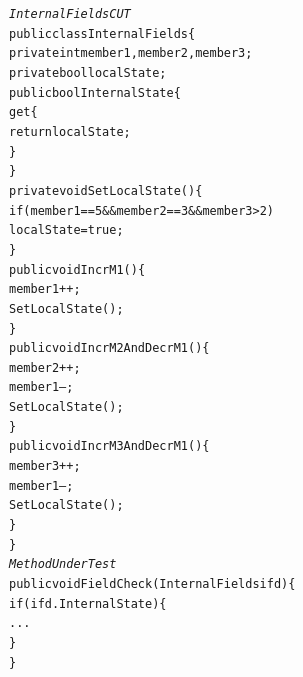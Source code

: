 \begin{figure}[t]
\begin{CodeOut}
\begin{alltt}
\emph{InternalFields CUT}
public class InternalFields \{
\hspace*{0.2in}private int member1, member2, member3;
\hspace*{0.2in}private bool localState;
\hspace*{0.2in}public bool InternalState \{
\hspace*{0.3in}get \{
\hspace*{0.4in}return localState;
\hspace*{0.3in}\}
\hspace*{0.2in}\}
\hspace*{0.2in}private void SetLocalState() \{
\hspace*{0.3in}if (member1 == 5 && member2 == 3 && member3 > 2)
\hspace*{0.4in}localState = true;
\hspace*{0.2in}\}
\hspace*{0.2in}public void IncrM1() \{
\hspace*{0.3in}member1++;
\hspace*{0.3in}SetLocalState();
\hspace*{0.2in}\}
\hspace*{0.2in}public void IncrM2AndDecrM1() \{
\hspace*{0.3in}member2++;
\hspace*{0.3in}member1--;
\hspace*{0.3in}SetLocalState();
\hspace*{0.2in}\}
\hspace*{0.2in}public void IncrM3AndDecrM1() \{
\hspace*{0.3in}member3++;
\hspace*{0.3in}member1--;
\hspace*{0.3in}SetLocalState();
\hspace*{0.2in}\}   
\}
\emph{Method Under Test}
public void FieldCheck(InternalFields ifd) \{
\hspace*{0.2in}if (ifd.InternalState) \{
\hspace*{0.3in}...
\hspace*{0.2in}\}
\}
\end{alltt}
\end{CodeOut}
\end{figure}


